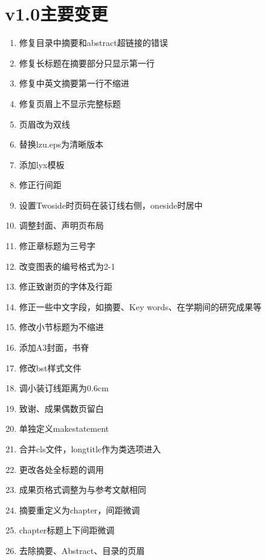 \documentclass[twoside,longtitle]{LZUthesis}
\begin{document}
\chapter{v1.0主要变更\label{chap:changelog}}
\begin{enumerate}
\item 修复目录中摘要和abstract超链接的错误
\item 修复长标题在摘要部分只显示第一行
\item 修复中英文摘要第一行不缩进
\item 修复页眉上不显示完整标题
\item 页眉改为双线
\item 替换lzu.eps为清晰版本
\item 添加lyx模板
\item 修正行间距
\item 设置Twoside时页码在装订线右侧，oneside时居中
\item 调整封面、声明页布局
\item 修正章标题为三号字
\item 改变图表的编号格式为2-1
\item 修正致谢页的字体及行距
\item 修正一些中文字段，如摘要、Key words、在学期间的研究成果等
\item 修改小节标题为不缩进
\item 添加A3封面，书脊
\item 修改bst样式文件
\item 调小装订线距离为0.6cm
\item 致谢、成果偶数页留白
\item 单独定义makestatement
\item 合并cls文件，longtitle作为类选项进入
\item 更改各处全标题的调用
\item 成果页格式调整为与参考文献相同
\item 摘要重定义为chapter，间距微调
\item chapter标题上下间距微调
\item 去除摘要、Abstract、目录的页眉
\end{enumerate}
\end{document}
